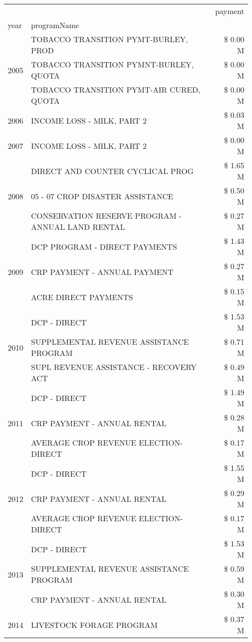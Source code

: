 \begin{tabular}{llr}
\toprule
 &  & payment \\
year & programName &  \\
\midrule
\multirow[t]{3}{*}{2005} & TOBACCO TRANSITION PYMT-BURLEY, PROD & \$ 0.00 M \\
 & TOBACCO TRANSITION PYMNT-BURLEY, QUOTA & \$ 0.00 M \\
 & TOBACCO TRANSITION PYMT-AIR CURED, QUOTA & \$ 0.00 M \\
\cline{1-3}
2006 & INCOME LOSS - MILK, PART 2 & \$ 0.03 M \\
\cline{1-3}
2007 & INCOME LOSS - MILK, PART 2 & \$ 0.00 M \\
\cline{1-3}
\multirow[t]{3}{*}{2008} & DIRECT AND COUNTER CYCLICAL PROG & \$ 1.65 M \\
 & 05 - 07 CROP DISASTER ASSISTANCE & \$ 0.50 M \\
 & CONSERVATION RESERVE PROGRAM - ANNUAL LAND RENTAL & \$ 0.27 M \\
\cline{1-3}
\multirow[t]{3}{*}{2009} & DCP PROGRAM - DIRECT PAYMENTS & \$ 1.43 M \\
 & CRP PAYMENT - ANNUAL PAYMENT & \$ 0.27 M \\
 & ACRE DIRECT PAYMENTS & \$ 0.15 M \\
\cline{1-3}
\multirow[t]{3}{*}{2010} & DCP - DIRECT & \$ 1.53 M \\
 & SUPPLEMENTAL REVENUE ASSISTANCE PROGRAM & \$ 0.71 M \\
 & SUPL REVENUE ASSISTANCE - RECOVERY ACT & \$ 0.49 M \\
\cline{1-3}
\multirow[t]{3}{*}{2011} & DCP - DIRECT & \$ 1.49 M \\
 & CRP PAYMENT - ANNUAL RENTAL & \$ 0.28 M \\
 & AVERAGE CROP REVENUE ELECTION-DIRECT & \$ 0.17 M \\
\cline{1-3}
\multirow[t]{3}{*}{2012} & DCP - DIRECT & \$ 1.55 M \\
 & CRP PAYMENT - ANNUAL RENTAL & \$ 0.29 M \\
 & AVERAGE CROP REVENUE ELECTION-DIRECT & \$ 0.17 M \\
\cline{1-3}
\multirow[t]{3}{*}{2013} & DCP - DIRECT & \$ 1.53 M \\
 & SUPPLEMENTAL REVENUE ASSISTANCE PROGRAM & \$ 0.59 M \\
 & CRP PAYMENT - ANNUAL RENTAL & \$ 0.30 M \\
\cline{1-3}
\multirow[t]{3}{*}{2014} & LIVESTOCK FORAGE PROGRAM & \$ 0.37 M \\

\end{tabular}
